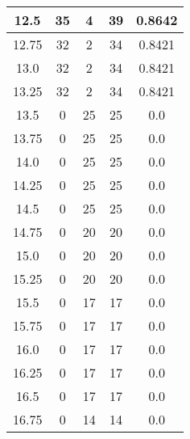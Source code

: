 \documentclass[letterpaper, 12pt]{article}
\begin{document}
\begin{longtable}{|c|c|c|c|c|}
12.5 & 35 & 4 & 39 & 0.8642 \\
\hline
12.75 & 32 & 2 & 34 & 0.8421 \\
\hline
13.0 & 32 & 2 & 34 & 0.8421 \\
\hline
13.25 & 32 & 2 & 34 & 0.8421 \\
\hline
13.5 & 0 & 25 & 25 & 0.0 \\
\hline
13.75 & 0 & 25 & 25 & 0.0 \\
\hline
14.0 & 0 & 25 & 25 & 0.0 \\
\hline
14.25 & 0 & 25 & 25 & 0.0 \\
\hline
14.5 & 0 & 25 & 25 & 0.0 \\
\hline
14.75 & 0 & 20 & 20 & 0.0 \\
\hline
15.0 & 0 & 20 & 20 & 0.0 \\
\hline
15.25 & 0 & 20 & 20 & 0.0 \\
\hline
15.5 & 0 & 17 & 17 & 0.0 \\
\hline
15.75 & 0 & 17 & 17 & 0.0 \\
\hline
16.0 & 0 & 17 & 17 & 0.0 \\
\hline
16.25 & 0 & 17 & 17 & 0.0 \\
\hline
16.5 & 0 & 17 & 17 & 0.0 \\
\hline
16.75 & 0 & 14 & 14 & 0.0 \\
\hline
\end{longtable}
\end{document}
